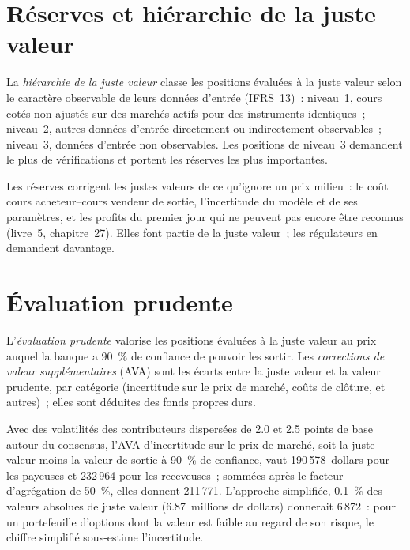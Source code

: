 \section{Réserves et hiérarchie de la juste valeur}

\begin{definition}\label{def:rc:pnl-explain-and-independent-price-verification:hierarchy}
La \emph{hiérarchie de la juste valeur} classe les positions évaluées à la juste valeur selon le
caractère observable de leurs données d'entrée (IFRS~13)~: niveau~1, cours cotés non ajustés sur des marchés actifs pour
des instruments identiques~; niveau~2, autres données d'entrée directement ou indirectement observables~; niveau~3, données
d'entrée non observables. Les positions de niveau~3 demandent le
plus de vérifications et portent les réserves les plus importantes.
\end{definition}

Les réserves corrigent les justes valeurs de ce qu'ignore un prix milieu~: le coût cours acheteur--cours vendeur de sortie,
l'incertitude du modèle et de ses paramètres, et les profits du premier jour qui ne peuvent pas encore être reconnus
(livre~5, chapitre~27). Elles font partie de la juste valeur~; les régulateurs en demandent davantage.

\section{Évaluation prudente}

\begin{definition}\label{def:rc:pnl-explain-and-independent-price-verification:pv}
L'\emph{évaluation prudente} valorise les positions évaluées à la juste valeur au prix auquel
la banque a 90~\% de confiance de pouvoir les sortir. Les \emph{corrections de valeur
supplémentaires} (AVA) sont les écarts entre la juste valeur et
la valeur prudente, par catégorie (incertitude sur le prix de marché, coûts de clôture,  et autres)~; elles sont
déduites des fonds propres durs.
\end{definition}

\begin{example}\label{ex:rc:pnl-explain-and-independent-price-verification:ava}
Avec des volatilités des contributeurs dispersées de 2.0 et 2.5 points de base autour du consensus, l'AVA d'incertitude
sur le prix de marché, soit la juste valeur moins la valeur de sortie à 90~\% de confiance, vaut 190\,578~dollars pour les payeuses et
232\,964 pour les receveuses~; sommées après le facteur d'agrégation de 50~\%, elles donnent 211\,771. L'approche simplifiée,
0.1~\% des valeurs absolues de juste valeur (6.87~millions de dollars) donnerait 6\,872~: pour un portefeuille d'options dont la valeur est
faible au regard de son risque, le chiffre simplifié sous-estime l'incertitude.
\end{example}

